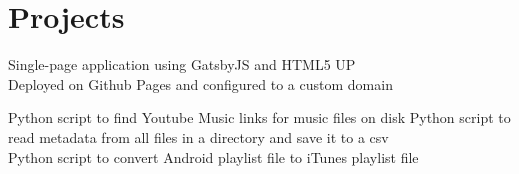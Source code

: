 \documentclass[]{resume}
\begin{document}
\begin{minipage}[t]{0.66\textwidth}
\sectionsep


\section{Projects}

Single-page application using GatsbyJS and HTML5 UP 
\\ Deployed on Github Pages and configured to a custom domain

Python script to find Youtube Music links for music files on disk
Python script to read metadata from all files in a directory and save it to a csv \\
Python script to convert Android playlist file to iTunes playlist file


\end{minipage} 
\end{document}
